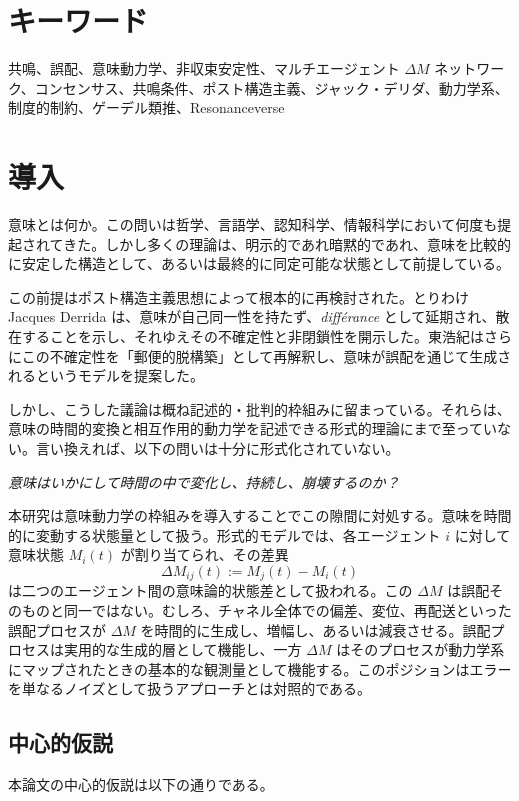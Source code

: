 \documentclass[11pt,a4paper]{article}
\theoremstyle{definition}
\begin{document}
\section*{キーワード}
共鳴、誤配、意味動力学、非収束安定性、マルチエージェント $\Delta M$ ネットワーク、コンセンサス、共鳴条件、ポスト構造主義、ジャック・デリダ、動力学系、制度的制約、ゲーデル類推、Resonanceverse

\section{導入}

意味とは何か。この問いは哲学、言語学、認知科学、情報科学において何度も提起されてきた。しかし多くの理論は、明示的であれ暗黙的であれ、意味を比較的に安定した構造として、あるいは最終的に同定可能な状態として前提している。

この前提はポスト構造主義思想によって根本的に再検討された。とりわけ Jacques Derrida は、意味が自己同一性を持たず、\textit{différance} として延期され、散在することを示し、それゆえその不確定性と非閉鎖性を開示した。東浩紀はさらにこの不確定性を「郵便的脱構築」として再解釈し、意味が誤配を通じて生成されるというモデルを提案した。

しかし、こうした議論は概ね記述的・批判的枠組みに留まっている。それらは、意味の時間的変換と相互作用的動力学を記述できる形式的理論にまで至っていない。言い換えれば、以下の問いは十分に形式化されていない。

\textit{意味はいかにして時間の中で変化し、持続し、崩壊するのか？}

本研究は意味動力学の枠組みを導入することでこの隙間に対処する。意味を時間的に変動する状態量として扱う。形式的モデルでは、各エージェント $i$ に対して意味状態 $M_i(t)$ が割り当てられ、その差異
\[
\Delta M_{ij}(t) := M_j(t) - M_i(t)
\]
は二つのエージェント間の意味論的状態差として扱われる。この $\Delta M$ は誤配そのものと同一ではない。むしろ、チャネル全体での偏差、変位、再配送といった誤配プロセスが $\Delta M$ を時間的に生成し、増幅し、あるいは減衰させる。誤配プロセスは実用的な生成的層として機能し、一方 $\Delta M$ はそのプロセスが動力学系にマップされたときの基本的な観測量として機能する。このポジションはエラーを単なるノイズとして扱うアプローチとは対照的である。

\subsection{中心的仮説}

本論文の中心的仮説は以下の通りである。
\end{document}
